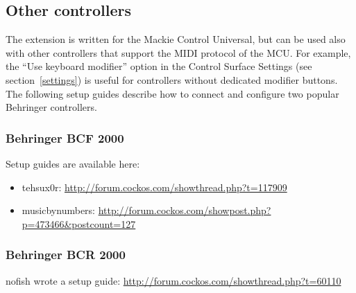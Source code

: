 \subsection{Other controllers}\label{other}

The extension is written for the Mackie Control Universal, but can be used
also with other controllers that support the MIDI protocol of the MCU. For
example, the ``Use keyboard modifier'' option in the \mcu Control Surface
Settings (see section~\ref{settings}) is useful for controllers without
dedicated modifier buttons. The following setup guides describe how to
connect and configure two popular Behringer controllers.

\subsubsection{Behringer BCF 2000}\label{BCF}

Setup guides are available here:
\begin{itemize}
\item tehsux0r: \url{http://forum.cockos.com/showthread.php?t=117909}
\item musicbynumbers:
  \url{http://forum.cockos.com/showpost.php?p=473466&postcount=127}
\end{itemize}

\subsubsection{Behringer BCR 2000}\label{BCR}

nofish wrote a setup guide:
\url{http://forum.cockos.com/showthread.php?t=60110}
